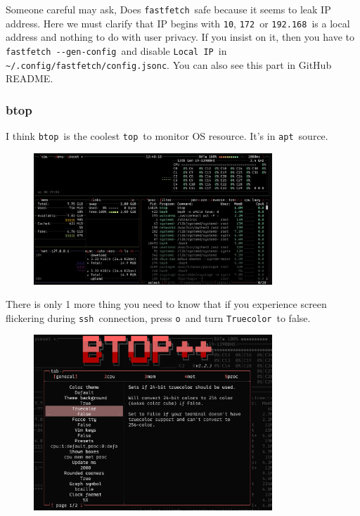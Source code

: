 \documentclass[12pt]{ctexart}
\begin{document}
Someone careful may ask, Does \texttt{fastfetch}\ safe because it seems
to leak IP address. Here we must clarify that IP begins with
\texttt{10}, \texttt{172}\ or \texttt{192.168}\ is a local address and
nothing to do with user privacy. If you insist on it, then you have to
\texttt{fastfetch\ -\/-gen-config}\ and disable \texttt{Local\ IP}\ in
\texttt{\textasciitilde{}/.config/fastfetch/config.jsonc}. You can also
see this part in GitHub README.

\subsubsection{\textbf{btop}}

I think \texttt{btop}\ is the coolest \texttt{top}\ to monitor OS
resource. It's in \texttt{apt}\ source.

\begin{figure}[H]
    \centering
    \includegraphics[width=0.8\textwidth,keepaspectratio]{assets/Linux/2.6 The way to pretend B/3.png}
\end{figure}

There is only 1 more thing you need to know that if you experience
screen flickering during \texttt{ssh}\ connection, press \texttt{o}\ and
turn \texttt{Truecolor}\ to false.

\begin{figure}[H]
    \centering
    \includegraphics[width=0.8\textwidth,keepaspectratio]{assets/Linux/2.6 The way to pretend B/4.png}
\end{figure}
\end{document}
